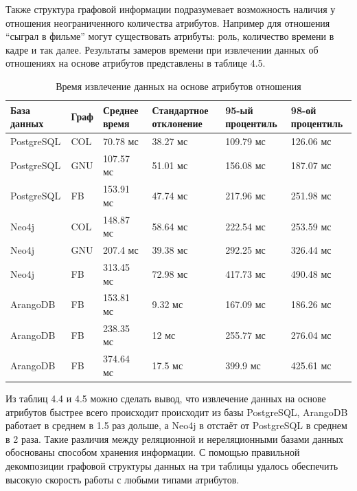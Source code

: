 Также структура графовой информации подразумевает возможность наличия у отношения неограниченного количества атрибутов. Например для отношения “сыграл в фильме” могут существовать атрибуты: роль, количество времени в кадре и так далее. Результаты замеров времени при извлечении данных об отношениях на основе атрибутов представлены в таблице 4.5.

\begin{table} [htbp]
    \centering\small
    \caption{Время извлечение данных на основе атрибутов отношения}
    \begin{tabular}{|p{3cm}|p{1cm}|p{2cm}|p{2cm}|p{2cm}|p{2cm}|}
        \hline
        База данных & Граф & Среднее время & Стандартное отклонение & 95-ый процентиль & 98-ой процентиль \\ \hline
        PostgreSQL  & COL  & 70.78 мс      & 38.27 мс               & 109.79 мс        & 126.06 мс        \\ \hline
        PostgreSQL  & GNU  & 107.57 мс     & 51.01 мс               & 156.08 мс        & 187.07 мс        \\ \hline
        PostgreSQL  & FB   & 153.91 мс     & 47.74 мс               & 217.96 мс        & 251.98 мс        \\ \hline
        Neo4j       & COL  & 148.87 мс     & 58.64 мс               & 222.54 мс        & 253.59 мс        \\ \hline
        Neo4j       & GNU  & 207.4 мс      & 39.38 мс               & 292.25 мс        & 326.44 мс        \\ \hline
        Neo4j       & FB   & 313.45 мс     & 72.98 мс               & 417.73 мс        & 490.48 мс        \\ \hline
        ArangoDB    & FB   & 153.81 мс     & 9.32 мс                & 167.09 мс        & 186.26 мс        \\ \hline
        ArangoDB    & FB   & 238.35 мс     & 12 мс                  & 255.77 мс        & 276.04 мс        \\ \hline
        ArangoDB    & FB   & 374.64 мс     & 17.5 мс                & 399.9 мс         & 425.61 мс        \\ \hline
    \end{tabular}
    \normalsize
\end{table}

Из таблиц 4.4 и 4.5 можно сделать вывод, что извлечение данных на основе атрибутов быстрее всего происходит происходит из базы PostgreSQL, ArangoDB работает в среднем в 1.5 раз дольше, а Neo4j в отстаёт от PostgreSQL в среднем в 2 раза. Такие различия между реляционной и нереляционными базами данных обоснованы способом хранения информации. С помощью правильной декомпозиции графовой структуры данных на три таблицы удалось обеспечить высокую скорость работы с любыми типами атрибутов.

